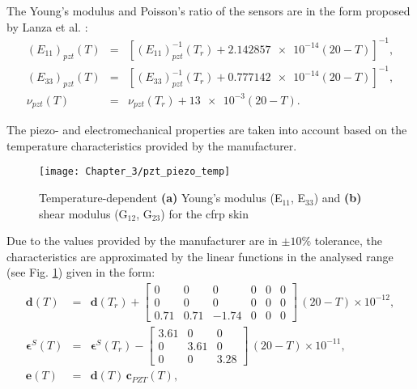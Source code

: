 The Young's modulus and Poisson's ratio of the sensors are in the form proposed by Lanza et al. \cite{lanza2008temperature}:
\begin{eqnarray}
	\left(E_{11}\right)_{pzt}(T) & = & \left[\left(E_{11}\right)^{-1}_{pzt}(T_r) + \num{2.142857e-14}(20-T)\right]^{-1},\\
	\left(E_{33}\right)_{pzt}(T) & = & \left[\left(E_{33}\right)^{-1}_{pzt}(T_r) + \num{0.777142e-14}(20-T)\right]^{-1},\\
	\nu_{pzt}(T) & = & \nu_{pzt}(T_r) + \num{13e-3}(20-T).
	\label{eq:pzt_temp}
\end{eqnarray}

The piezo- and electromechanical properties are taken into account based on the
temperature characteristics provided by the manufacturer.
\begin{figure}
	\begin{center}
		\texttt{[image: Chapter\_3/pzt\_piezo\_temp]}
	\end{center}
	\caption{Temperature-dependent \textbf{(a)} Young's modulus (E\(_{11}\), E\(_{33}\)) and \textbf{(b)} shear modulus (G\(_{12}\), G\(_{23}\)) for the \acf{cfrp} skin}
	\label{fig:pzt_temp}
\end{figure}
Due to the values provided by the manufacturer are in \(\pm10\%\) tolerance, the characteristics are approximated by the linear functions in the analysed range (see Fig. \ref{fig:pzt_temp}) given in the form:
\begin{eqnarray}
	\textbf{d}(T) & = & \boldsymbol{d}(T_r) + \left[
	\begin{array}{cccccc}
		0 & 0 & 0 & 0 & 0 & 0\\
		0 & 0 & 0 & 0 & 0 & 0\\
		0.71 & 0.71 & -1.74 & 0 & 0 & 0
	\end{array}\right]\,(20-T) \times10^{-12},\\
	\boldsymbol{\epsilon}^S(T) & = & \boldsymbol{\epsilon}^S(T_r) - \left[
	\begin{array}{ccc}
		3.61 & 0 & 0\\
		0 & 3.61 & 0\\
		0 & 0 & 3.28
	\end{array}\right]\,(20-T) \times10^{-11},\\
	\textbf{e}(T) & = & \textbf{d}(T)\,\textbf{c}_{PZT}(T),
	\label{eq:piezo_temp}
\end{eqnarray}
%
